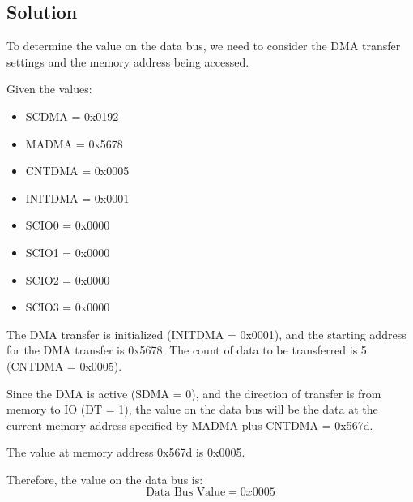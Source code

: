 \subsection*{Solution}
To determine the value on the data bus, we need to consider the DMA transfer
settings and the memory address being accessed.

Given the values:
\begin{itemize}
    \item SCDMA = 0x0192
    \item MADMA = 0x5678
    \item CNTDMA = 0x0005
    \item INITDMA = 0x0001
    \item SCIO0 = 0x0000
    \item SCIO1 = 0x0000
    \item SCIO2 = 0x0000
    \item SCIO3 = 0x0000
\end{itemize}

The DMA transfer is initialized (INITDMA = 0x0001),
and the starting address for the DMA transfer is 0x5678.
The count of data to be transferred is 5 (CNTDMA = 0x0005).

Since the DMA is active (SDMA = 0), and the direction of transfer is from memory to IO (DT = 1),
the value on the data bus will be the data at the current memory address specified by MADMA plus
CNTDMA = 0x567d.

The value at memory address 0x567d is 0x0005.

Therefore, the value on the data bus is:
\[
\text{Data Bus Value} = 0x0005
\]